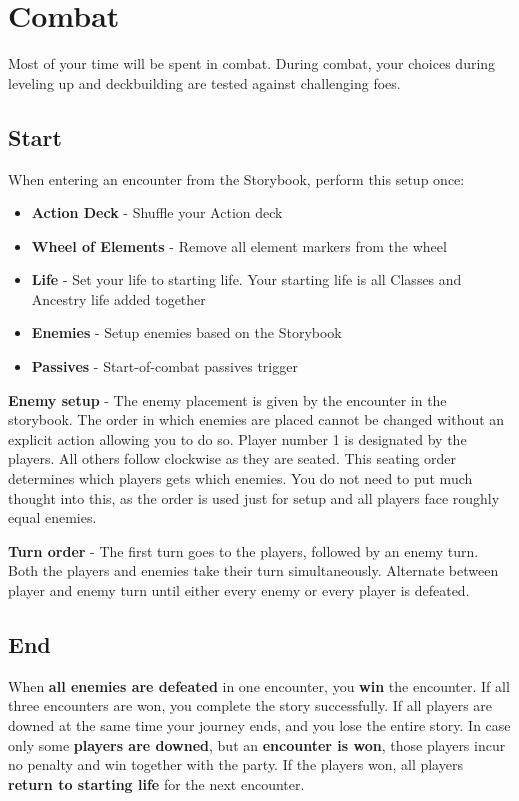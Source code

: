 
\section{Combat}
Most of your time will be spent in combat. During combat, your choices during leveling up and deckbuilding are tested against challenging foes.
\subsection*{Start} 
When entering an encounter from the Storybook, perform this setup once:\\
\begin{minipage}[t][2.7cm][t]{\textwidth}
	\begin{itemize}
		
		\item \textbf{Action Deck} - Shuffle your Action deck 
		\item \textbf{Wheel of Elements} - Remove all element markers from the wheel
		\item \textbf{Life} - Set your life to starting life. Your starting life is all Classes and Ancestry life added together
		\item \textbf{Enemies} - Setup enemies based on the Storybook
		\item \textbf{Passives} - Start-of-combat passives trigger
		
	\end{itemize}
\end{minipage}


\textbf{Enemy setup} - The enemy placement is given by the encounter in the storybook. The order in which enemies are placed cannot be changed without an explicit action allowing you to do so. Player number 1 is designated by the players. All others follow clockwise as they are seated. This seating order determines which players gets which enemies. You do not need to put much thought into this, as the order is used just for setup and all players face roughly equal enemies.

\textbf{Turn order} - The first turn goes to the players, followed by an enemy turn. Both the players and enemies take their turn simultaneously. Alternate between player and enemy turn until either every enemy or every player is defeated.

\subsection*{End}
When  \textbf{all enemies are defeated} in one encounter, you  \textbf{win} the encounter. If all three encounters are won, you complete the story successfully.
If all players are downed at the same time your journey ends, and you lose the entire story. In case only some  \textbf{players are downed}, but an \textbf{encounter is won}, those players incur no penalty and win together with the party. If the players won, all players \textbf{return to starting life} for the next encounter.

